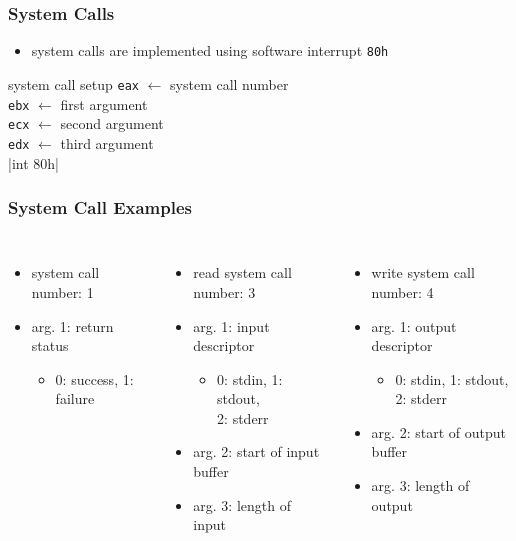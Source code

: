 \documentclass[dvipsnames]{beamer}
\begin{document}
\begin{frame}
  \frametitle{System Calls}

  \begin{itemize}
    \item system calls are implemented using software interrupt \texttt{80h}
  \end{itemize}

  \bigskip
  \begin{block}{system call setup}
    \texttt{eax} $\leftarrow$ system call number\\
    \texttt{ebx} $\leftarrow$ first argument\\
    \texttt{ecx} $\leftarrow$ second argument\\
    \texttt{edx} $\leftarrow$ third argument\\
    |int 80h|
  \end{block}
\end{frame}

\begin{frame}
  \frametitle{System Call Examples}

  \begin{columns}[b]
    \begin{itemize}
      \item {} system call number: 1
      \item arg. 1: return status
      \begin{itemize}
        \item 0: success, 1: failure
      \end{itemize}
    \end{itemize}

    \pause
    \bigskip
    \begin{itemize}
      \item read system call number: 3
      \item arg. 1: input descriptor
      \begin{itemize}
        \item 0: stdin, 1: stdout,\\
          2: stderr
      \end{itemize}
      \item arg. 2: start of input buffer
      \item arg. 3: length of input
    \end{itemize}

    \pause
    \begin{itemize}
      \item write system call number: 4
      \item arg. 1: output descriptor
      \begin{itemize}
        \item 0: stdin, 1: stdout,\\
          2: stderr
      \end{itemize}
      \item arg. 2: start of output buffer
      \item arg. 3: length of output
    \end{itemize}
  \end{columns}
\end{frame}
\end{document}
